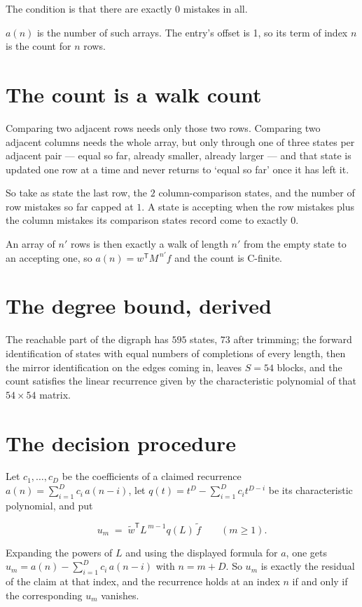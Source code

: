 \documentclass[11pt]{article}
\theoremstyle{definition}
\begin{document}
The condition is that there are exactly $0$ mistakes in all.

$a(n)$ is the number of such arrays. The entry's offset is 1, so its term of index $n$ is the count for $n$ rows.

\section{The count is a walk count}

Comparing two adjacent rows needs only those two rows. Comparing two adjacent columns needs the whole array, but only through one of three states per adjacent pair --- equal so far, already smaller, already larger --- and that state is updated one row at a time and never returns to `equal so far' once it has left it.

So take as state the last row, the $2$ column-comparison states, and the number of row mistakes so far capped at $1$. A state is accepting when the row mistakes plus the column mistakes its comparison states record come to exactly $0$.

An array of $n'$ rows is then exactly a walk of length $n'$ from the empty state to an accepting one, so $a(n) = w^{\mathsf T}M^{\,n'}f$ and the count is C-finite.

\section{The degree bound, derived}

The reachable part of the digraph has $595$ states, $73$ after trimming; the forward identification of states with equal numbers of completions of every length, then the mirror identification on the edges coming in, leaves $S = 54$ blocks, and the count satisfies the linear recurrence given by the characteristic polynomial of that $54\times54$ matrix.

\section{The decision procedure}

Let $c_1,\dots,c_D$ be the coefficients of a claimed recurrence $a(n) = \sum_{i=1}^{D} c_i\,a(n-i)$, let $q(t) = t^{D} - \sum_{i=1}^{D} c_i t^{D-i}$ be its characteristic polynomial, and put

\[u_m \;=\; \tilde w^{\mathsf T} L^{\,m-1} q(L)\,\tilde f \qquad (m \ge 1).\]

Expanding the powers of $L$ and using the displayed formula for $a$, one gets $u_m = a(n) - \sum_{i=1}^{D} c_i\,a(n-i)$ with $n = m + D$. So $u_m$ is exactly the residual of the claim at that index, and the recurrence holds at an index $n$ if and only if the corresponding $u_m$ vanishes.
\end{document}
